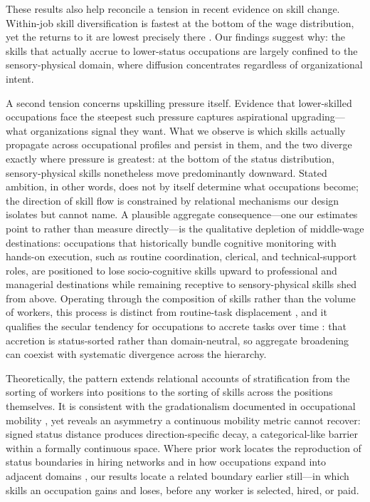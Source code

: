 \documentclass[11pt, letterpaper]{article} %
\newcommand{\parencite}[1]{\cite{#1}}
\begin{document}
These results also help reconcile a tension in recent evidence on skill change. Within-job skill diversification is fastest at the bottom of the wage distribution, yet the returns to it are lowest precisely there \parencite{han_skill_2026}. Our findings suggest why: the skills that actually accrue to lower-status occupations are largely confined to the sensory-physical domain, where diffusion concentrates regardless of organizational intent.

A second tension concerns upskilling pressure itself. Evidence that lower-skilled occupations face the steepest such pressure \parencite{tong_lower-skilled_2025} captures aspirational upgrading---what organizations signal they want. What we observe is which skills actually propagate across occupational profiles and persist in them, and the two diverge exactly where pressure is greatest: at the bottom of the status distribution, sensory-physical skills nonetheless move predominantly downward. Stated ambition, in other words, does not by itself determine what occupations become; the direction of skill flow is constrained by relational mechanisms our design isolates but cannot name. A plausible aggregate consequence---one our estimates point to rather than measure directly---is the qualitative depletion of middle-wage destinations: occupations that historically bundle cognitive monitoring with hands-on execution, such as routine coordination, clerical, and technical-support roles, are positioned to lose socio-cognitive skills upward to professional and managerial destinations while remaining receptive to sensory-physical skills shed from above. Operating through the composition of skills rather than the volume of workers, this process is distinct from routine-task displacement \parencite{autor_growth_2013, acemoglu_skills_2011}, and it qualifies the secular tendency for occupations to accrete tasks over time \parencite{jackson_division_2025}: that accretion is status-sorted rather than domain-neutral, so aggregate broadening can coexist with systematic divergence across the hierarchy.

Theoretically, the pattern extends relational accounts of stratification \parencite{tomaskovic-devey_relational_2019, tahlin_skill_2023, cheng_flows_2020, lin_network_2022} from the sorting of workers into positions to the sorting of skills across the positions themselves. It is consistent with the gradationalism documented in occupational mobility \parencite{york_gradationalism_2025}, yet reveals an asymmetry a continuous mobility metric cannot recover: signed status distance produces direction-specific decay, a categorical-like barrier within a formally continuous space. Where prior work locates the reproduction of status boundaries in hiring networks and in how occupations expand into adjacent domains \parencite{clauset_systematic_2015, henaut_polyoccupationalism_2023}, our results locate a related boundary earlier still---in which skills an occupation gains and loses, before any worker is selected, hired, or paid.
\end{document}
